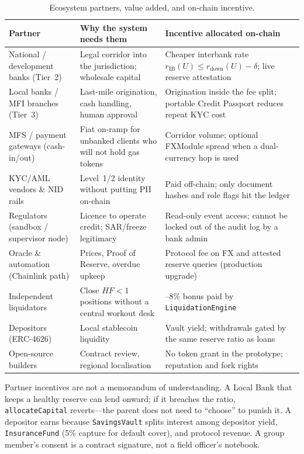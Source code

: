 \documentclass[11pt,a4paper]{article}
\newcommand{\tablehead}{\rowcolor{HeadShade}\bfseries}
\begin{document}
\begin{table}[H]
\centering
\small
\caption{Ecosystem partners, value added, and on-chain incentive.}
\label{tab:partners}
\begin{tabular}{@{}>{\raggedright\arraybackslash}p{3.2cm}>{\raggedright\arraybackslash}p{4.6cm}>{\raggedright\arraybackslash}p{6.0cm}@{}}
\toprule
\tablehead Partner & Why the system needs them & Incentive allocated on-chain \\
\midrule
National / development banks (Tier~2) & Legal corridor into the jurisdiction; wholesale capital & Cheaper interbank rate $r_{\mathrm{IB}}(U)\le r_{\mathrm{down}}(U)-\delta$; live reserve attestation \\
\rowcolor{RowShade}
Local banks / MFI branches (Tier~3) & Last-mile origination, cash handling, human approval & Origination inside the fee split; portable Credit Passport reduces repeat KYC cost \\
MFS / payment gateways (cash-in/out) & Fiat on-ramp for unbanked clients who will not hold gas tokens & Corridor volume; optional FXModule spread when a dual-currency hop is used \\
\rowcolor{RowShade}
KYC/AML vendors \& NID rails & Level~1/2 identity without putting PII on-chain & Paid off-chain; only document hashes and role flags hit the ledger \\
Regulators (sandbox / supervisor node) & Licence to operate credit; SAR/freeze legitimacy & Read-only event access; cannot be locked out of the audit log by a bank admin \\
\rowcolor{RowShade}
Oracle \& automation (Chainlink path) & Prices, Proof of Reserve, overdue upkeep & Protocol fee on FX and attested reserve queries (production upgrade) \\
Independent liquidators & Close $HF<1$ positions without a central workout desk & 5--8\% bonus paid by \texttt{LiquidationEngine} \\
\rowcolor{RowShade}
Depositors (ERC-4626) & Local stablecoin liquidity & Vault yield; withdrawals gated by the same reserve ratio as loans \\
Open-source builders & Contract review, regional localisation & No token grant in the prototype; reputation and fork rights \\
\bottomrule
\end{tabular}
\end{table}

Partner incentives are not a memorandum of understanding. A Local Bank that keeps a healthy reserve can lend onward; if it breaches the ratio, \texttt{allocateCapital} reverts---the parent does not need to ``choose'' to punish it. A depositor earns because \texttt{SavingsVault} splits interest among depositor yield, \texttt{InsuranceFund} (5\% capture for default cover), and protocol revenue. A group member's consent is a contract signature, not a field officer's notebook.
\end{document}
